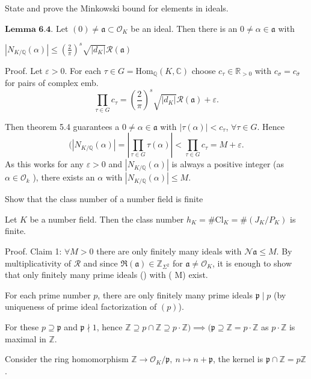 State and prove the Minkowski bound for elements in ideals.

\( \textbf{Lemma 6.4.} \) 
Let \((0) \neq \mathfrak{a} \subset \mathcal{O}_K\) be an ideal. Then there is an \(0 \neq \alpha \in \mathfrak{a}\) with

\(|N_{K/\mathbb{Q}}(\alpha)| \leq \left(\frac{2}{\pi}\right)^s \sqrt{|d_K|} \mathcal{R}(\mathfrak{a})\)

Proof.
Let \( \varepsilon > 0 \). For each \( \tau \in G = \text{Hom}_{\mathbb{Q}}(K, \mathbb{C}) \) choose \( c_\tau \in \mathbb{R}_{>0} \) with 
\( c_\sigma = c_{\overline{\sigma}} \) for pairs of complex emb.
\[
\prod_{\tau \in G} c_\tau = \left(\frac{2}{\pi}\right)^s \sqrt{|d_K|} \mathcal{R}(\mathfrak{a}) + \varepsilon.
\]

Then theorem 5.4 guarantees a \( 0 \neq \alpha \in \mathfrak{a}\) with \( |\tau(\alpha)| < c_\tau \), \( \forall \tau \in G \). 
Hence
\[
(|N_{K/\mathbb{Q}}(\alpha)| = | \prod_{\tau \in G} \tau(\alpha) | < \prod_{\tau \in G} c_\tau = M + \varepsilon.
\]
As this works for any \( \varepsilon > 0 \) and \( |N_{K/\mathbb{Q}}(\alpha)| \) is always a positive integer (as \( \alpha \in \mathcal{O}_k \) ), there exists an \( \alpha \) with \( |N_{K/\mathbb{Q}}(\alpha)| \leq M \).



Show that the class number of a number field is finite

Let \( K \) be a number field. Then the class number \( h_K = \#\text{Cl}_K = \#(J_K/P_K) \) is finite.

Proof. Claim 1: \(\forall M > 0\) there are only finitely many ideals with \(\mathcal{N} \mathfrak{a} \le M\).
By multiplicativity of \(\mathcal{R}\) and since \(\mathfrak{R}(\mathfrak{a}) \in \mathbb{Z}_{\Sigma^2}\) for \(\mathfrak{a} \neq \mathcal{O}_K\), 
it is enough to show that only finitely many prime ideals () with (  \leq M) exist.

For each prime number \( p \), there are only finitely many prime ideals \(\mathfrak{p} \mid p\) 
(by uniqueness of prime ideal factorization of \( (p) \)).

For these \(p \supseteq \mathfrak{p}\) and \(\mathfrak{p} \nmid 1\), hence 
\(\mathbb{Z} \supseteq p \cap \mathbb{Z} \supseteq p \cdot \mathbb{Z}) \implies (\mathfrak{p} \supseteq \mathbb{Z} = p \cdot \mathbb{Z}\)
as \(p \cdot \mathbb{Z}\) is maximal in \( \mathbb{Z} \).

Consider the ring homomorphism \(\mathbb{Z} \to \mathcal{O}_K/\mathfrak{p}, \ n \mapsto n + \mathfrak{p}\), the kernel is 
\(\mathfrak{p} \cap \mathbb{Z} = p\mathbb{Z}\).

